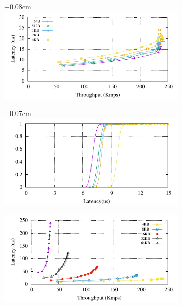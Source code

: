 \begin{figure}[htp!]
  \begin{subfigure}{\columnwidth}
    \advance\leftskip+0.08cm
    \includegraphics[width=0.97\columnwidth]{figures/benchmark/graphs/figure-performance-vs-size-single-group-up-to-4k}
  \end{subfigure}
  \begin{subfigure}{\columnwidth}
    \advance\leftskip+0.07cm
    \includegraphics[width=0.96\columnwidth]{figures/benchmark/graphs/figure-performance-vs-size-single-group-cdf-up-to-4k}
  \end{subfigure}
  \begin{subfigure}{\columnwidth}
    \advance\leftskip-0.1cm
    \includegraphics[width=0.99\columnwidth]{figures/benchmark/graphs/figure-performance-vs-size-single-group-from-4k}

\end{subfigure}
\end{figure}

